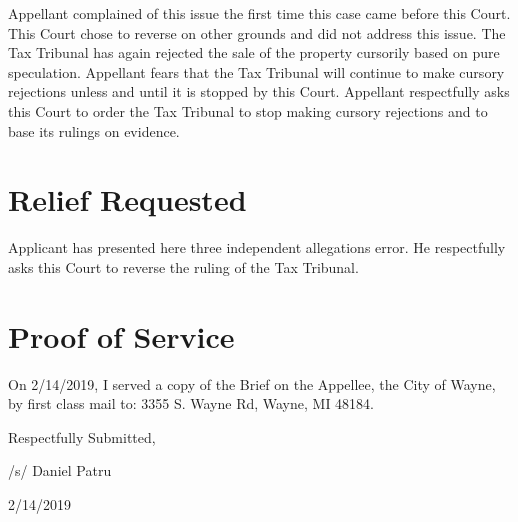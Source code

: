 \documentclass[12pt,\documentclassflag]{michiganCourtOfAppealsBrief}
\begin{document}
Appellant complained of this issue the first time this case came before this Court. This Court chose to reverse on other grounds and did not address this issue. The Tax Tribunal has again rejected the sale of the property cursorily based on pure speculation. Appellant fears that the Tax Tribunal will continue to make cursory rejections unless and until it is stopped by this Court. Appellant respectfully asks this Court to order the Tax Tribunal to stop making cursory rejections and to base its rulings on evidence.

\section{Relief Requested}

Applicant has presented here three independent allegations error. He respectfully asks this Court to reverse the ruling of the Tax Tribunal. 

\section{Proof of Service}

On 2/14/2019, I served a copy of the Brief on the Appellee, the City of Wayne, by first class mail to: 3355 S. Wayne Rd, Wayne, MI 48184. 


\vspace{1\baselineskip}

{ \setlength{\leftskip}{3.5in}

  Respectfully Submitted,

  /s/ Daniel Patru

  2/14/2019

  \setlength{\leftskip}{0pt}}

\newpage\empty%
\end{document}
